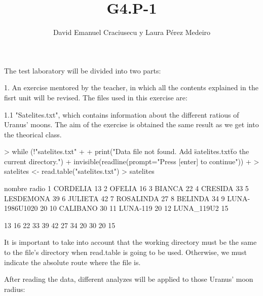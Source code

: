 \documentclass[a4paper]{article}
\title{G4.P-1}
\author{David Emanuel Craciusecu y Laura Pérez Medeiro}
\begin{document}
\maketitle
The test laboratory will be divided into two parts:

1. An exercise mentored by the teacher, in which all the contents explained
in the fisrt unit will be revised. The files used in this exercise are:

	1.1 "Satelites.txt", which contains information about the different ratious of Uranus' moons.
	The aim of the exercise is obtained the same result as we get into the theorical class. 
	
\begin{Schunk}
\begin{Sinput}
> while (!"satelites.txt" %in% list.files(getwd()))
+ {
+   print("Data file not found. Add \"satelites.txt\" to the current directory.")
+   invisible(readline(prompt="Press [enter] to continue"))
+ }
> 	satelites <- read.table("satelites.txt")
> 	satelites
\end{Sinput}
\begin{Soutput}
           nombre radio
1        CORDELIA    13
2          OFELIA    16
3          BIANCA    22
4         CRESIDA    33
5       LESDEMONA    39
6         JULIETA    42
7       ROSALINDA    27
8         BELINDA    34
9  LUNA-1986U1020    20
10       CALIBANO    30
11       LUNA-119    20
12     LUNA_119U2    15
\end{Soutput}
\begin{Soutput}
 [1] 13 16 22 33 39 42 27 34 20 30 20 15
\end{Soutput}
\end{Schunk}

It is important to take into account that the working directory must be the same to the file's
directory when read.table is going to be used. Otherwise, we must indicate the absolute route where
the file is.
	
After reading the data, different analyzes will be applied to those Uranus' moon radius:
	
\end{document}
